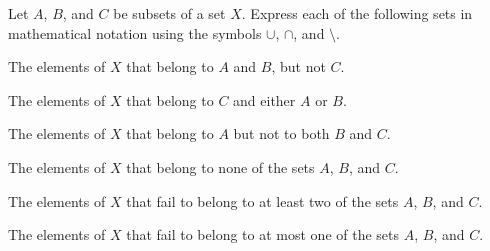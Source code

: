 
\be

\item Let $A$, $B$, and $C$ be subsets of a set $X$. Express each of the following sets in mathematical notation using the symbols $\cup$, $\cap$, and $\setminus$.
\ba
\item The elements of $X$ that belong to $A$ and $B$, but not $C$.

\item The elements of $X$ that belong to $C$ and either $A$ or $B$.

\item The elements of $X$ that belong to $A$ but not to both $B$ and $C$.

\item The elements of $X$ that belong to none of the sets $A$, $B$, and $C$.

\item The elements of $X$ that fail to belong to at least two of the sets $A$, $B$, and $C$.

\item  The elements of $X$ that fail to belong to at most one of the sets $A$, $B$, and $C$.

\ea

\begin{comment}

\ExerciseSolution

\ba
\item This set $A \cap B$ is the set of elements that belong to both $A$ and $B$. So the set in question is $(A \cap B) \setminus C$. 

\item The set $A \cup B$ is the set of elements belonging to $A$ or $B$. So the set in question is $C \cap (A \cup B)$. 

\item The set of elements that belong to both $B$ and $C$ is $B \cap C$. So the set in question is $A \setminus (B \cap C)$. 

\item We remove the elements of $A \cup B \cup C$ from $X$. So the set in question is $X \setminus (A \cup B \cup C)$. 

\item The set of elements that belong to at least two of the sets $A$, $B$, and $C$ is $(A \cap B) \cup (A \cap C) \cup (B \cap C)$. So the set in question is $X \setminus ((A \cap B) \cup (A \cap C) \cup (B \cap C))$. 

\item  The set of elements that belong to $A$ but not $B$ or $C$ is $A \setminus (B \cup C)$. So the set of elements that belong to exactly one of $A$, $B$, or $C$ is $(A \setminus (B \cup C)) \cup (B \setminus (A \cup C)) \cup (C \setminus (A \cup B))$. The set of elements that belong to none of $A$, $B$, or $C$ is $X \setminus(A \cup B \cup C)$. So the set in question is 
\[(A \setminus (B \cup C)) \cup (B \setminus (A \cup C)) \cup (C \setminus (A \cup B)) \cup (X \setminus(A \cup B \cup C)).\]

\ea

\end{comment}




